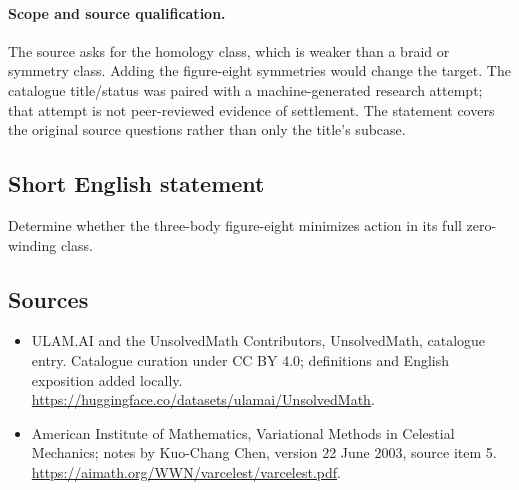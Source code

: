 \documentclass[11pt]{article}
\begin{document}
\paragraph{Scope and source qualification.}The source asks for the homology class, which is weaker than a braid or symmetry class. Adding the figure-eight symmetries would change the target. The catalogue title/status was paired with a machine-generated research attempt; that attempt is not peer-reviewed evidence of settlement. The statement covers the original source questions rather than only the title’s subcase.
\subsection{Short English statement}
Determine whether the three-body figure-eight minimizes action in its full zero-winding class.
\subsection{Sources}
\begin{itemize}
\item[\hypertarget{source:statement:1}{S1}] ULAM.AI and the UnsolvedMath Contributors, UnsolvedMath, catalogue entry. Catalogue curation under CC BY 4.0; definitions and English exposition added locally.
\url{https://huggingface.co/datasets/ulamai/UnsolvedMath}.
\item[\hypertarget{source:statement:2}{S2}] American Institute of Mathematics, Variational Methods in Celestial Mechanics; notes by Kuo-Chang Chen, version 22 June 2003, source item 5.
\url{https://aimath.org/WWN/varcelest/varcelest.pdf}.
\end{itemize}
\label{end:statement}
\end{document}
